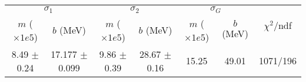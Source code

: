 \begin{tabular}{cc|cc|cc||c}
\multicolumn{2}{c|}{$\sigma_1$} & \multicolumn{2}{|c}{$\sigma_2$} & \multicolumn{2}{|c}{$\sigma_G$}  & \multirow{2}{*}{$\chi^2/$ndf}\\
$m$ ($\times1e5$) & $b$ (MeV) & $m$ ($\times1e5$) & $b$ (MeV) & $m$ ($\times1e5$) & $b$ (MeV) & \\
\hline
8.49 $\pm$ 0.24 & 17.177 $\pm$ 0.099 & 9.86 $\pm$ 0.39 & 28.67 $\pm$ 0.16 & 15.25 & 49.01 & 1071/196\\
\end{tabular}
